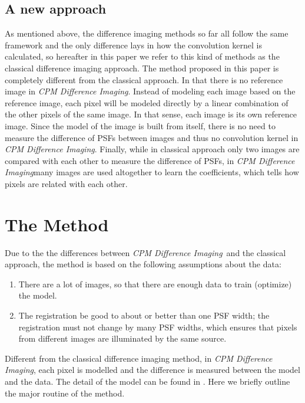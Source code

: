 \documentclass[12pt, preprint]{aastex}
\newcommand{\project}[1]{\textsl{#1}}
\newcommand{\cpmdiff}{\project{CPM Difference Imaging}}
\begin{document}
\subsection{A new approach}
As mentioned above, the difference imaging methods so far \citep{imagesub1, alard, varyingkernel, bramich} all follow the same framework and the only difference lays in how the convolution kernel is calculated, so hereafter in this paper we refer to this kind of methods as the classical difference imaging approach. 
The method proposed in this paper is completely different from the classical approach. 
In that there is no reference image in \cpmdiff. 
Instead of modeling each image based on the reference image, each pixel will be modeled directly by a linear combination of the other pixels of the same image. 
In that sense, each image is its own reference image.
Since the model of the image is built from itself, there is no need to measure the difference of PSFs between images and thus no convolution kernel in \cpmdiff. 
Finally, while in classical approach only two images are compared with each other to measure the difference of PSFs, in \cpmdiff many images are used altogether to learn the coefficients, which tells how pixels are related with each other.

\section{The Method}
Due to the the differences between \cpmdiff\ and the classical approach, the method is based on the following assumptions about the data:
\begin{enumerate}
\item
There are a lot of images, so that there are enough data to train (optimize) the model.
\item
The registration be good to about or better than one PSF width; the registration must not change by many PSF widths, which ensures that pixels from different images are illuminated by the same source.
\end{enumerate}

Different from the classical difference imaging method, in \cpmdiff, each pixel is modelled and the difference is measured between the model and the data. 
The detail of the model can be found in \cite{cpm}. 
Here we briefly outline the major routine of the method.
\end{document}
